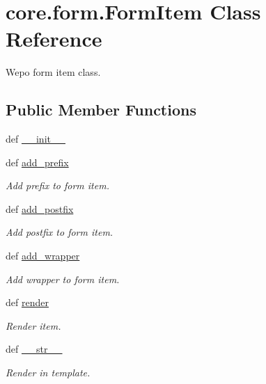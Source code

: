 \hypertarget{classcore_1_1form_1_1FormItem}{\section{core.\-form.\-Form\-Item Class Reference}
\label{classcore_1_1form_1_1FormItem}
}


Wepo form item class.  


\subsection*{Public Member Functions}
\begin{DoxyCompactItemize}
\item 
def \hyperlink{classcore_1_1form_1_1FormItem_aa0a048b676775a4fef17db83c875345a}{\-\_\-\-\_\-init\-\_\-\-\_\-}
\item 
def \hyperlink{classcore_1_1form_1_1FormItem_a2e2bcee0f838174135d18e2c15bccf15}{add\-\_\-prefix}
\begin{DoxyCompactList}\small\item\em Add prefix to form item. \end{DoxyCompactList}\item 
def \hyperlink{classcore_1_1form_1_1FormItem_abf2af5b4454b1779f9b7dbea6bc8957f}{add\-\_\-postfix}
\begin{DoxyCompactList}\small\item\em Add postfix to form item. \end{DoxyCompactList}\item 
def \hyperlink{classcore_1_1form_1_1FormItem_aa806eb4a6ac50151b86ad8506e50f9c8}{add\-\_\-wrapper}
\begin{DoxyCompactList}\small\item\em Add wrapper to form item. \end{DoxyCompactList}\item 
def \hyperlink{classcore_1_1form_1_1FormItem_a52dcdea485438ca5a2728a1ce8ae664c}{render}
\begin{DoxyCompactList}\small\item\em Render item. \end{DoxyCompactList}\item 
def \hyperlink{classcore_1_1form_1_1FormItem_a6d6c14d0f757847ef8c1dcf9b956f0f8}{\-\_\-\-\_\-str\-\_\-\-\_\-}
\begin{DoxyCompactList}\small\item\em Render in template. \end{DoxyCompactList}\end{DoxyCompactItemize}
